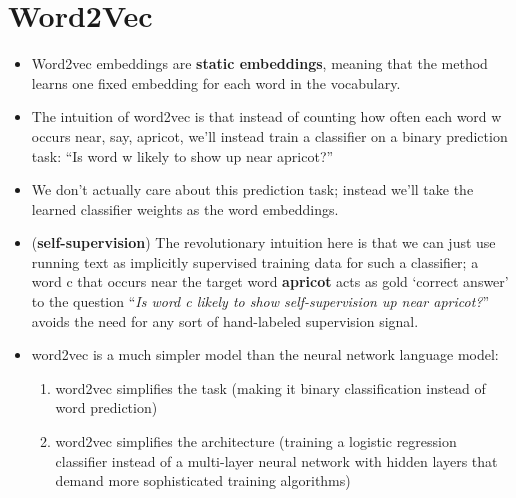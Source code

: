 \chapter{Word2Vec \cite{nlp-1}}

\begin{itemize}
    \item Word2vec embeddings are \textbf{static embeddings}, meaning that the method learns one fixed embedding for each word in the vocabulary.
    
    \item The intuition of word2vec is that instead of counting how often each word w occurs near, say, apricot, we’ll instead train a classifier on a binary prediction task: “Is word w likely to show up near apricot?” 
    
    \item We don’t actually care about this prediction task; instead we’ll take the learned classifier weights as the word embeddings.

    \item (\textbf{self-supervision}) The revolutionary intuition here is that we can just use running text as implicitly supervised training data for such a classifier; a word c that occurs near the target word \textbf{apricot} acts as gold ‘correct answer’ to the question “\textit{Is word c likely to show self-supervision up near apricot?}”\\
    avoids the need for any sort of hand-labeled supervision signal.

    \item word2vec is a much simpler model than the neural network language model:
    \begin{enumerate}
        \item word2vec simplifies the task (making it binary classification instead of word prediction)

        \item word2vec simplifies the architecture (training a logistic regression classifier instead of a multi-layer neural network with hidden layers that demand more sophisticated training algorithms)
    \end{enumerate}
\end{itemize}

